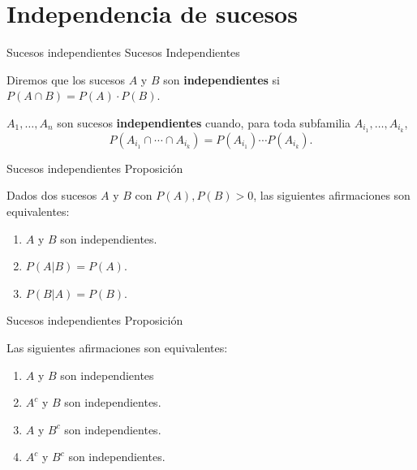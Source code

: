 \documentclass[
  ignorenonframetext,
]{beamer}
\providecommand{\tightlist}{%
  \setlength{\itemsep}{0pt}\setlength{\parskip}{0pt}}
\begin{document}
\hypertarget{independencia-de-sucesos}{%
\section{Independencia de sucesos}\label{independencia-de-sucesos}}

\begin{frame}{Sucesos independientes}
\protect\hypertarget{sucesos-independientes}{}
Sucesos Independientes

Diremos que los sucesos \(A\) y \(B\) son \textbf{independientes} si
\(P(A\cap B)=P(A)\cdot P(B)\).

\(A_1,\ldots, A_n\) son sucesos \textbf{independientes} cuando, para
toda subfamilia \(A_{i_1},\ldots,A_{i_k}\), \[
P(A_{i_1}\cap \cdots\cap A_{i_k})=P(A_{i_1})\cdots P(A_{i_k}).
\]
\end{frame}

\begin{frame}{Sucesos independientes}
\protect\hypertarget{sucesos-independientes-1}{}
Proposición

Dados dos sucesos \(A\) y \(B\) con \(P(A),P(B)>0\), las siguientes
afirmaciones son equivalentes:

\begin{enumerate}
\tightlist
\item
  \(A\) y \(B\) son independientes.
\item
  \(P(A|B)=P(A)\).
\item
  \(P(B|A)=P(B)\).
\end{enumerate}
\end{frame}

\begin{frame}{Sucesos independientes}
\protect\hypertarget{sucesos-independientes-2}{}
Proposición

Las siguientes afirmaciones son equivalentes:

\begin{enumerate}
\tightlist
\item
  \(A\) y \(B\) son independientes
\item
  \(A^c\) y \(B\) son independientes.
\item
  \(A\) y \(B^c\) son independientes.
\item
  \(A^c\) y \(B^c\) son independientes.
\end{enumerate}
\end{frame}
\end{document}
